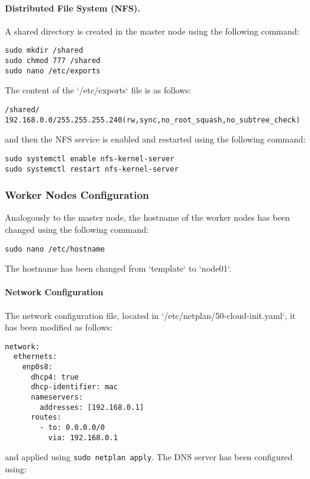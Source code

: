 \paragraph{Distributed File System (NFS).}

A shared directory is created in the master node using the following command:

\begin{verbatim}
sudo mkdir /shared
sudo chmod 777 /shared
sudo nano /etc/exports
\end{verbatim}
The content of the `/etc/exports` file is as follows:

\begin{verbatim}
/shared/ 192.168.0.0/255.255.255.240(rw,sync,no_root_squash,no_subtree_check)
\end{verbatim}
and then the NFS service is enabled and restarted using the following command:

\begin{verbatim}
sudo systemctl enable nfs-kernel-server
sudo systemctl restart nfs-kernel-server
\end{verbatim}

\subsubsection{Worker Nodes Configuration}

Analogously to the master node, the hostname of the worker nodes has been changed using the following command:

\begin{verbatim}
sudo nano /etc/hostname
\end{verbatim}
The hostname has been changed from `template` to `node01`. 

\paragraph{Network Configuration}

The network configuration file, located in `/etc/netplan/50-cloud-init.yaml`, it has been modified as follows:
\begin{verbatim}
network:
  ethernets:
    enp0s8:
      dhcp4: true
      dhcp-identifier: mac
      nameservers:
        addresses: [192.168.0.1]
      routes:
        - to: 0.0.0.0/0
          via: 192.168.0.1
\end{verbatim}
and applied using \texttt{sudo netplan apply}.
The DNS server has been configured using:

